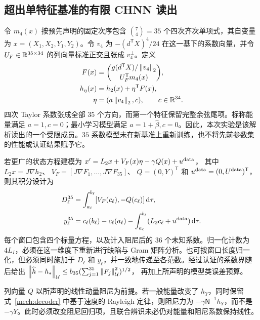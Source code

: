 \subsection{超出单特征基准的有限 CHNN 读出}
\label{ss:full-features}

令 $m_4(x)$ 按预先声明的固定次序包含 $\binom{7}{4}=35$ 个四次齐次单项式，其自变量为 $x=(X_1,X_2,Y_1,Y_2)$。令 $v_4$ 为 $-(d^{\mathsf T}X)^4/24$ 在这一基下的系数向量，并令 $U_F\in\mathbb R^{35\times34}$ 的列向量标准正交且张成 $v_4^\perp$。定义
\begin{equation}\label{ss:full-readout}
\begin{aligned}
 F(x)&=\binom{g(d^{\mathsf T}X)/\left\lVert v_4\right\rVert_2}{U_F^{\mathsf T}m_4(x)},\\
 h_\eta(x)&=h_2(x)+\eta^{\mathsf T}F(x),\\
 \eta&=(a\left\lVert v_4\right\rVert_2,c),\qquad c\in\mathbb R^{34}.
\end{aligned}
\end{equation}
四次 Taylor 系数张成全部 $35$ 个方向，而第一个特征保留完整余弦尾项。标称能量满足 $a=1,c=0$；最小学习模型满足 $a=1+\widehat\beta,c=0$。因此，本次实验是该解析读出的一个受限成员。$35$ 系数模型未在新基准上重新训练，也不将先前参数集的性能或认证结果赋予它。

若更广的状态方程建模为
$x'=L_2x+V_F(x)\eta-\gamma Q(x)+u^{\rm data}$，
其中 $L_2x=J\nabla h_2$、
$V_F=[J\nabla F_1,\ldots,J\nabla F_{35}]$、
$Q=(0,Y)^{\mathsf T}$ 和 $u^{\rm data}=(0,U^{\rm data})^{\mathsf T}$，则其积分设计为
\begin{equation}\label{ss:full-design}
\begin{aligned}
 D_\ell^{35}&=\int_{a_\ell}^{b_\ell}[V_F(c_\ell),-Q(c_\ell)]\,\mathrm d\tau,\\
 y_\ell^{35}&=c_\ell(b_\ell)-c_\ell(a_\ell)
       -\int_{a_\ell}^{b_\ell}(L_2c_\ell+u^{\rm data})\,\mathrm d\tau.
\end{aligned}
\end{equation}
每个窗口包含四个标量方程，以及计入阻尼后的 $36$ 个未知系数。归一化计数为 $4L_I$，必须在这一维度下重新进行缺陷与 Gram 矩阵分析。也可按窗口长度归一化，但必须同时施加于 $D_\ell$ 和 $y_\ell$，并一致地传递至各范数。经过认证的系数界随后给出
$\left\lVert\widehat h-h_*\right\rVert_{\mathcal U}\le b_{35}(\sum_{j=1}^{35}\left\lVert F_j\right\rVert_{\mathcal U}^2)^{1/2}$，
再加上所声明的模型类误差预算。

列向量 $Q$ 以所声明的线性动量阻尼为前提。若一般能量改变了 $h_Y$，同时保留式~\eqref{mech:decoder} 中基于速度的 Rayleigh 定律，则阻尼力为 $-\gamma\mathsf N^{-1}h_Y$，而不是 $-\gamma Y$。此时必须改变阻尼回归项，且联合辨识未必仍对能量和阻尼系数保持线性。


